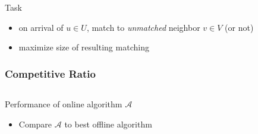 \documentclass{beamer}
\begin{document}
\begin{frame}
\begin{columns}
\begin{column}{.3\textwidth}
    \end{column}
  \end{columns}
  \begin{alertblock}{Task}
    \begin{itemize}
      \item<8-> on arrival of $u \in U$, match to \emph{unmatched} neighbor $v \in V$ (or not)
      \item<9-> maximize size of resulting matching
    \end{itemize}   
  \end{alertblock}
\end{frame}

\begin{frame}
  \frametitle{Competitive Ratio}
  \begin{columns}
    \begin{column}{.65\textwidth}
      \begin{alertblock}{Performance of online algorithm $\mathcal{A}$}
        \begin{itemize}
          \item Compare $\mathcal{A}$ to best offline algorithm
        \end{itemize}
      \end{alertblock}
    \end{column}
    \begin{column}{.3\textwidth}

\end{column}
\end{columns}
\end{frame}
\end{document}
